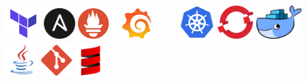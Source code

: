 \documentclass[]{friggeri-cv}
\begin{document}
\begin{bottom}
\qquad \qquad  %
\includegraphics[height=12mm]{logo/terraform-logo.png} \qquad \qquad \qquad  %
\includegraphics[height=12mm]{logo/ansible-logo.png} \qquad \qquad \qquad %
\includegraphics[height=12mm]{logo/prometheus-logo.png} \qquad \qquad  %
\includegraphics[height=12mm]{logo/grafana-logo.png} \qquad \qquad  %
~
~
\qquad \qquad \qquad \qquad \qquad %
\includegraphics[height=13mm]{logo/kubernetes-logo.png}  \qquad \qquad  %
\includegraphics[height=13mm]{logo/openshift-logo.png}    \qquad \qquad  %
\includegraphics[height=13mm]{logo/docker-logo.png}  \qquad \qquad  %
~
~
\qquad \qquad   %
\includegraphics[height=13mm]{logo/java-logo.png} \qquad  \qquad  %
\includegraphics[height=12mm]{logo/git-logo.png} \qquad\qquad  \qquad %
\includegraphics[height=12mm]{logo/scala-logo.png} \qquad \qquad %

\end{bottom}
\end{document}
